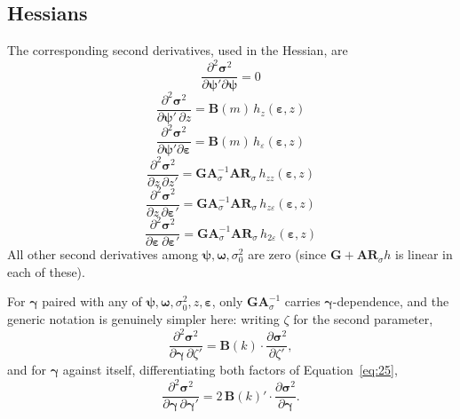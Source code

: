 \documentclass[12pt]{article}
\begin{document}
\subsection{Hessians}
The corresponding second derivatives, used in the Hessian, are
\begin{equation}
\frac{{\partial^{2} \mathbf{\sigma}^{2} }}{\partial\mathbf{\psi'}\partial\mathbf{\psi}} = 0
\label{eq:38}
\end{equation}
\begin{equation}
\frac{{\partial^{2} \mathbf{\sigma}^{2} }}{\partial \mathbf{\psi'} \, \partial z}
= \mathbf{B}(m) \, h_{z}\left( \mathbf{\varepsilon}, z \right)
\label{eq:39}
\end{equation}
\begin{equation}
\frac{{\partial^{2} \mathbf{\sigma}^{2} }}{\partial\mathbf{\psi'}\partial\mathbf{\varepsilon}} = \mathbf{B}(m) \, h_{\varepsilon}\left( \mathbf{\varepsilon},z \right)
\label{eq:40}
\end{equation}
\begin{equation}
\frac{{\partial^{2} \mathbf{\sigma}^{2} }}{\partial z\,\partial z'} = \mathbf{GA}_{\sigma}^{-1}\mathbf{AR}_{\sigma}\, h_{zz}\left( \mathbf{\varepsilon},z \right)
\label{eq:41}
\end{equation}
\begin{equation}
\frac{{\partial^{2} \mathbf{\sigma}^{2} }}{\partial z\,\partial\mathbf{\varepsilon}'} = \mathbf{GA}_{\sigma}^{-1}\mathbf{AR}_{\sigma}\, h_{z\varepsilon}\left( \mathbf{\varepsilon},z \right)
\label{eq:42}
\end{equation}
\begin{equation}
\frac{{\partial^{2} \mathbf{\sigma}^{2} }}{\partial\mathbf{\varepsilon}\,\partial\mathbf{\varepsilon}'} = \mathbf{GA}_{\sigma}^{-1}\mathbf{AR}_{\sigma}\, h_{2\varepsilon}\left( \mathbf{\varepsilon},z \right)
\label{eq:H_eps}
\end{equation}
All other second derivatives among $\mathbf{\psi},\mathbf{\omega},\sigma_{0}^{2}$ are zero (since $\mathbf{G}+\mathbf{AR}_{\sigma}h$ is linear in each of these).

For $\boldsymbol{\gamma}$ paired with any of $\mathbf{\psi},\mathbf{\omega},\sigma_{0}^{2},z,\mathbf{\varepsilon}$, only $\mathbf{GA}_{\sigma}^{-1}$ carries $\boldsymbol{\gamma}$-dependence, and the generic notation is genuinely simpler here: writing $\zeta$ for the second parameter,
\begin{equation}
\frac{\partial^{2}\mathbf{\sigma}^{2}}{\partial\boldsymbol{\gamma}\,\partial\zeta'} = \mathbf{B}(k)\cdot\frac{\partial\mathbf{\sigma}^{2}}{\partial\zeta'},
\label{eq:46}
\end{equation}
and for $\boldsymbol{\gamma}$ against itself, differentiating both factors of Equation~\ref{eq:25},
\begin{equation}
\frac{\partial^{2}\mathbf{\sigma}^{2}}{\partial\boldsymbol{\gamma}\,\partial\boldsymbol{\gamma}'} = 2\,\mathbf{B}(k)'\cdot\frac{\partial\mathbf{\sigma}^{2}}{\partial\boldsymbol{\gamma}}.
\label{eq:34}
\end{equation}
\end{document}
